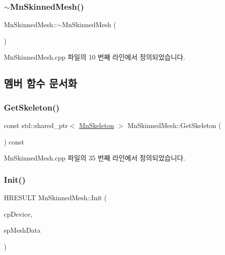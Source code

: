 \subsubsection{\texorpdfstring{$\sim$\+Mn\+Skinned\+Mesh()}{~MnSkinnedMesh()}}
{\footnotesize\ttfamily Mn\+Skinned\+Mesh\+::$\sim$\+Mn\+Skinned\+Mesh (\begin{DoxyParamCaption}{ }\end{DoxyParamCaption})}



Mn\+Skinned\+Mesh.\+cpp 파일의 10 번째 라인에서 정의되었습니다.



\subsection{멤버 함수 문서화}
\mbox{\label{class_m_n_l_1_1_mn_skinned_mesh_af1a7817424b8bed1d381fdf82b06a312}} 
\subsubsection{\texorpdfstring{Get\+Skeleton()}{GetSkeleton()}}
{\footnotesize\ttfamily const std\+::shared\+\_\+ptr$<$ \hyperlink{class_m_n_l_1_1_mn_skeleton}{Mn\+Skeleton} $>$ Mn\+Skinned\+Mesh\+::\+Get\+Skeleton (\begin{DoxyParamCaption}{ }\end{DoxyParamCaption}) const}



Mn\+Skinned\+Mesh.\+cpp 파일의 35 번째 라인에서 정의되었습니다.

\mbox{\label{class_m_n_l_1_1_mn_skinned_mesh_ad212179142cda2c4a722b58ab19a739e}} 
\subsubsection{\texorpdfstring{Init()}{Init()}}
{\footnotesize\ttfamily H\+R\+E\+S\+U\+LT Mn\+Skinned\+Mesh\+::\+Init (\begin{DoxyParamCaption}\item[{const \hyperlink{namespace_m_n_l_a1eec210db8f309a4a9ac0d9658784c31}{C\+P\+D3\+D\+Device} \&}]{cp\+Device,  }\item[{const std\+::shared\+\_\+ptr$<$ \hyperlink{class_m_n_l_1_1_mn_mesh_data}{Mn\+Mesh\+Data} $>$}]{sp\+Mesh\+Data }\end{DoxyParamCaption})\hspace{0.3cm}{\ttfamily [virtual]}}



